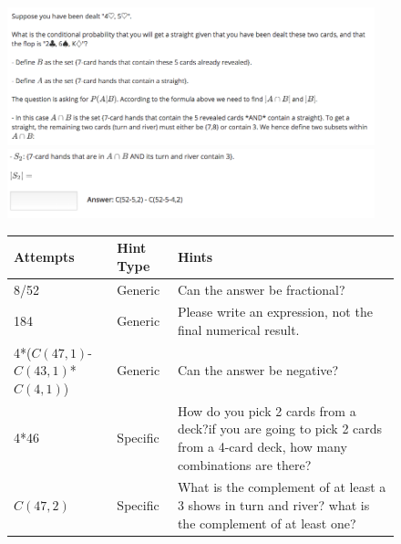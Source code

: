 \documentclass{llncs2e/llncs}
\begin{document}
\begin{figure}[t!]
  \centering
	\includegraphics[width=0.95\textwidth]{image/problem_screenshot.png} \\
	\includegraphics[width=0.95\textwidth]{image/part_screenshot.png}
   \label{fig:hint_prob}


\begin{center}
  \begin{tabular}{ p{2.5cm}  p{1.5cm}  p{7.5cm} }
    Attempts & Hint Type & Hints \\ \hline
    8/52 & Generic & Can the answer be fractional? \\ \hline
    184 & Generic & Please write an expression, not the final numerical result. \\ \hline
    4*($C(47,1)$-$C(43,1)$*$C(4,1)$) & Generic & Can the answer be negative? \\ \hline
   4*46 & Specific & How do you pick 2 cards from a deck?if you are going to pick 2 cards from a 4-card deck, how many combinations are there? \\ \hline
   $C(47,2)$ & Specific & What is the complement of at least a 3 shows in turn and river? what is the complement of at least one? \\
  \end{tabular}
  \label{tab:hints_sent}
  \end{center}
\end{figure}
\end{document}

